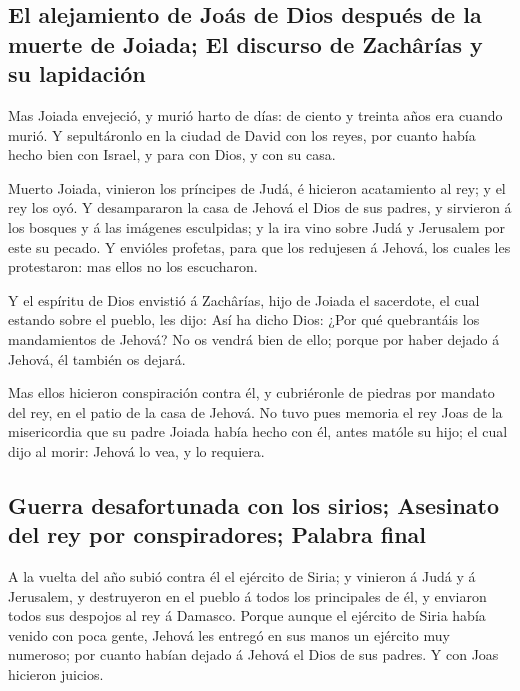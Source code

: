 \hypertarget{el-alejamiento-de-jouxe1s-de-dios-despuuxe9s-de-la-muerte-de-joiada-el-discurso-de-zachuxe2ruxedas-y-su-lapidaciuxf3n}{%
\subsection{El alejamiento de Joás de Dios después de la muerte de
Joiada; El discurso de Zachârías y su
lapidación}\label{el-alejamiento-de-jouxe1s-de-dios-despuuxe9s-de-la-muerte-de-joiada-el-discurso-de-zachuxe2ruxedas-y-su-lapidaciuxf3n}}

 Mas Joiada envejeció, y murió harto de días: de ciento y
treinta años era cuando murió.  Y sepultáronlo en la ciudad
de David con los reyes, por cuanto había hecho bien con Israel, y para
con Dios, y con su casa.

 Muerto Joiada, vinieron los príncipes de Judá, é hicieron
acatamiento al rey; y el rey los oyó.  Y desampararon la
casa de Jehová el Dios de sus padres, y sirvieron á los bosques y á las
imágenes esculpidas; y la ira vino sobre Judá y Jerusalem por este su
pecado.  Y envióles profetas, para que los redujesen á
Jehová, los cuales les protestaron: mas ellos no los escucharon.

 Y el espíritu de Dios envistió á Zachârías, hijo de Joiada
el sacerdote, el cual estando sobre el pueblo, les dijo: Así ha dicho
Dios: ¿Por qué quebrantáis los mandamientos de Jehová? No os vendrá bien
de ello; porque por haber dejado á Jehová, él también os dejará.

 Mas ellos hicieron conspiración contra él, y cubriéronle
de piedras por mandato del rey, en el patio de la casa de Jehová.
 No tuvo pues memoria el rey Joas de la misericordia que su
padre Joiada había hecho con él, antes matóle su hijo; el cual dijo al
morir: Jehová lo vea, y lo requiera.

\hypertarget{guerra-desafortunada-con-los-sirios-asesinato-del-rey-por-conspiradores-palabra-final}{%
\subsection{Guerra desafortunada con los sirios; Asesinato del rey por
conspiradores; Palabra
final}\label{guerra-desafortunada-con-los-sirios-asesinato-del-rey-por-conspiradores-palabra-final}}

 A la vuelta del año subió contra él el ejército de Siria;
y vinieron á Judá y á Jerusalem, y destruyeron en el pueblo á todos los
principales de él, y enviaron todos sus despojos al rey á Damasco.
 Porque aunque el ejército de Siria había venido con poca
gente, Jehová les entregó en sus manos un ejército muy numeroso; por
cuanto habían dejado á Jehová el Dios de sus padres. Y con Joas hicieron
juicios.


